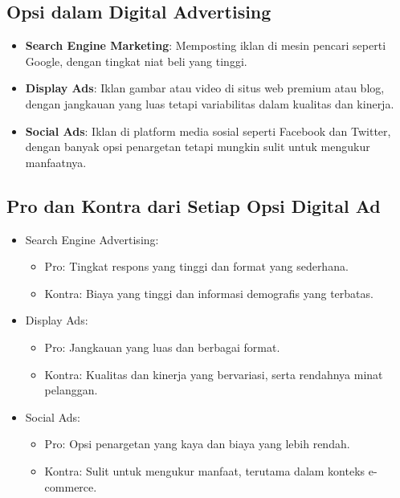 \documentclass{article}
\begin{document}
\subsection{Opsi dalam Digital Advertising}
\begin{itemize}
    \item \textbf{Search Engine Marketing}: Memposting iklan di mesin pencari seperti Google, dengan tingkat niat beli yang tinggi.
    \item \textbf{Display Ads}: Iklan gambar atau video di situs web premium atau blog, dengan jangkauan yang luas tetapi variabilitas dalam kualitas dan kinerja.
    \item \textbf{Social Ads}: Iklan di platform media sosial seperti Facebook dan Twitter, dengan banyak opsi penargetan tetapi mungkin sulit untuk mengukur manfaatnya.
\end{itemize}

\subsection{Pro dan Kontra dari Setiap Opsi Digital Ad}
\begin{itemize}
    \item Search Engine Advertising:
          \begin{itemize}
              \item Pro: Tingkat respons yang tinggi dan format yang sederhana.
              \item Kontra: Biaya yang tinggi dan informasi demografis yang terbatas.
          \end{itemize}
    \item Display Ads:
          \begin{itemize}
              \item Pro: Jangkauan yang luas dan berbagai format.
              \item Kontra: Kualitas dan kinerja yang bervariasi, serta rendahnya minat pelanggan.
          \end{itemize}
    \item Social Ads:
          \begin{itemize}
              \item Pro: Opsi penargetan yang kaya dan biaya yang lebih rendah.
              \item Kontra: Sulit untuk mengukur manfaat, terutama dalam konteks e-commerce.
          \end{itemize}
\end{itemize}
\end{document}
